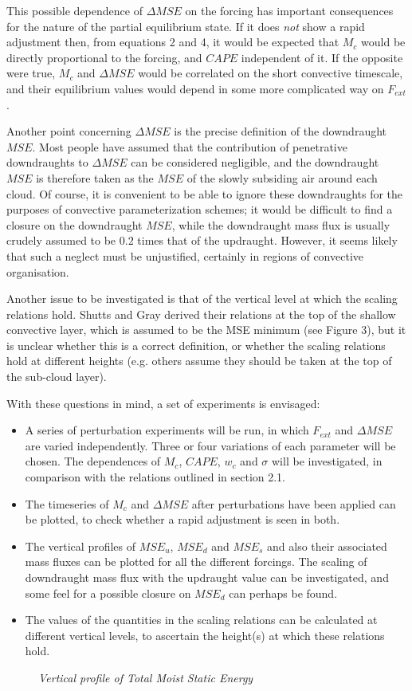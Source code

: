 \documentclass[11pt,a4paper]{article}
\begin{document}
This possible dependence of $\Delta MSE$ on the forcing has important
consequences for the nature of the partial equilibrium state. If it
does \textit{not} show a rapid adjustment then, from equations 2 and 4,
it would be expected that $M_c$ would be directly proportional to the
forcing, and $CAPE$ independent of it. If the opposite were true,
$M_c$ and $\Delta MSE$ would be correlated on the short convective
timescale, and their equilibrium values would depend in some more
complicated way on $F_{ext}$.

Another point concerning $\Delta MSE$ is the precise definition of
the downdraught $MSE$. Most people have assumed that the contribution of
penetrative downdraughts to $\Delta MSE$ can be considered negligible,
and the downdraught $MSE$ is therefore taken as the $MSE$ of the
slowly subsiding air around each cloud. Of course, it is convenient to
be able to ignore these downdraughts for the purposes of convective
parameterization schemes; it would be difficult to find a closure on
the downdraught $MSE$, while the downdraught mass flux is usually
crudely assumed to be $0.2$ times that of the updraught. However, it
seems likely that such a neglect must be unjustified, certainly in
regions of convective organisation.

Another issue to be investigated is that of the vertical level at
which the scaling relations hold. Shutts and Gray derived their
relations at the top of the shallow convective layer, which is assumed
to be the MSE minimum (see Figure 3), but it is unclear whether this is a correct definition, or
whether the scaling relations hold at different heights (e.g. others
assume they should be taken at the top of the sub-cloud layer).

With these questions in mind, a set of experiments is envisaged:
\begin{itemize}
\item A series of perturbation experiments will be run, in which $F_{ext}$ and
$\Delta MSE$ are varied independently. Three or four variations of
each parameter will be chosen. The dependences of $M_c$, $CAPE$, $w_c$
and $\sigma$ will be investigated, in comparison with the relations
outlined in section 2.1.
\item The timeseries of $M_c$ and $\Delta MSE$ after perturbations have
been applied can be plotted, to check whether a rapid adjustment is
seen in both.
\item The vertical profiles of $MSE_u$, $MSE_d$ and $MSE_s$ and also
their associated mass fluxes can be plotted for all the different
forcings. The scaling of downdraught mass flux with the updraught
value can be investigated, and some feel for a possible closure on
$MSE_d$ can perhaps be found.
\item The values of the quantities in the scaling relations can be
calculated at different vertical levels, to ascertain the height(s) at
which these relations hold.\\
\end{itemize}
\begin{figure}[h!!]
\center
\mbox{}
\caption{\it{Vertical profile of Total Moist Static Energy}}
\end{figure}
\end{document}
